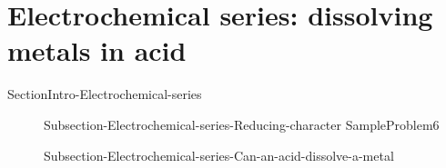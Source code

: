 \documentclass[main.tex]{subfiles}
\begin{document}
\section{Electrochemical series: dissolving metals in acid}{SectionIntro-Electrochemical-series}
\sloppy\begin{description}
 \item[] {Subsection-Electrochemical-series-Reducing-character}
  {SampleProblem6}
\item[] {Subsection-Electrochemical-series-Can-an-acid-dissolve-a-metal}
\end{description}
\end{document}
